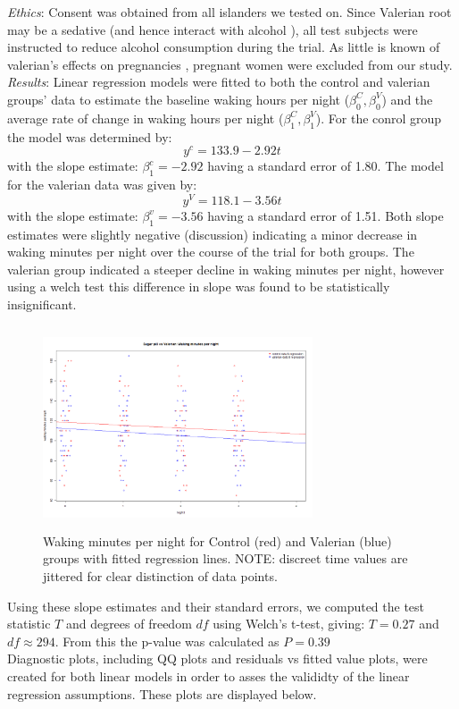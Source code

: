 \documentclass[10pt,preprintnumbers,amsmath,amssymb,floatfix,twocolumn,prl]{revtex4-2}
\begin{document}
\textit{Ethics}: Consent was obtained from all islanders we tested on. Since Valerian root may be a sedative (and hence interact with alcohol \cite{ValerianSource1}), all test subjects were instructed to reduce alcohol consumption during the trial. As little is known of valerian's effects on pregnancies \cite{ValerianSource2}, pregnant women were excluded from our study. \\

\textit{Results}: Linear regression models were fitted to both the control and valerian groups' data to estimate the baseline waking hours per night ($\beta_0^C, \beta_0^V$) and the average rate of change in waking hours per night ($\beta_1^C, \beta_1^V$). For the conrol group the model was determined by:
$$y^c = 133.9 - 2.92 t$$
with the slope estimate: $\beta_1^c = - 2.92$ having a standard error of 1.80.
The model for the valerian data was given by: 
$$y^V = 118.1 - 3.56 t$$
with the slope estimate: $\beta_1^v = - 3.56$ having a standard error of 1.51.
Both slope estimates were slightly negative (discussion) indicating a minor decrease in waking minutes per night over the course of the trial for both groups. The valerian group indicated a steeper decline in waking minutes per night, however using a welch test this difference in slope was found to be statistically insignificant. \\
\begin{figure}
\centering
\includegraphics[width = 8cm, height = 6cm]{linear_reg.png}
\caption{Waking minutes per night for Control (red) and Valerian (blue) groups with fitted regression lines. NOTE: discreet time values are jittered for clear distinction of data points.}
\end{figure}

Using these slope estimates and their standard errors, we computed the test statistic $T$ and degrees of freedom $df$ using Welch's t-test, giving: $T = 0.27$ and $df \approx 294$. From this the p-value was calculated as $P = 0.39$\\
Diagnostic plots, including QQ plots and residuals vs fitted value plots, were created for both linear models in order to asses the valididty of the linear regression assumptions. These plots are displayed below. \\
\end{document}
